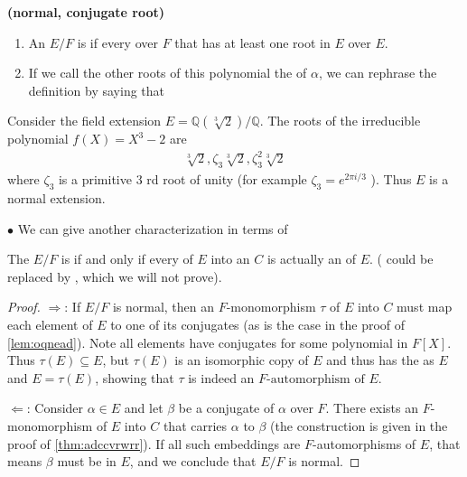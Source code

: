 \documentclass{article}
\newcommand{\bfs}[1]{\textbf{({#1}) }}
\begin{document}
\begin{defa}\bfs{normal, conjugate root}
\begin{enumerate}
    \item An  $E / F$ is  if every  over $F$ that has at least one root in $E$  over $E$.
    \item If we call the other roots of this polynomial the  of $\alpha$, we can rephrase the definition by saying that 
\end{enumerate}
\end{defa} 
\begin{exma}
Consider the field extension $E=\mathbb{Q}(\sqrt[3]{2}) / \mathbb{Q}$. The roots of the irreducible polynomial $f(X)=X^{3}-2$ are
\begin{align*}
\sqrt[3]{2}, \zeta_{3} \sqrt[3]{2}, \zeta_{3}^{2} \sqrt[3]{2}
\end{align*}
where $\zeta_{3}$ is a primitive 3 rd root of unity (for example $\zeta_{3}=e^{2 \pi i / 3}$ ). Thus $E$ is  a normal extension.
\end{exma} 

$\bullet$ We can give another characterization in terms of 
\begin{thma}\label{thm:inaedxx}
The  $E / F$ is  if and only if every  of $E$ into an  $C$ is actually an  of $E$. ( could be replaced by , which we will not prove).
\end{thma}
\begin{proof}
$\Rightarrow$: If $E / F$ is normal, then an $F$-monomorphism $\tau$ of $E$ into $C$ must map each element of $E$ to one of its conjugates (as is the case in the proof of \cref{lem:oqnead}). Note all elements have conjugates for some polynomial in $F[X]$. Thus $\tau(E) \subseteq E$, but $\tau(E)$ is an isomorphic copy of $E$ and thus has the  as $E$ and $E=\tau(E)$, showing that $\tau$ is indeed an ${F \text {-automorphism of } E}$.

$\Leftarrow$: Consider $\alpha \in E$ and let $\beta$ be a conjugate of $\alpha$ over $F$. There exists an $F$-monomorphism of $E$ into $C$ that carries $\alpha$ to $\beta$ (the construction is given in the proof of \cref{thm:adccvrwrr}). If all such embeddings are $F$-automorphisms of $E$, that means $\beta$ must be in $E$, and we conclude that $E / F$ is normal.
\end{proof}
\end{document}
